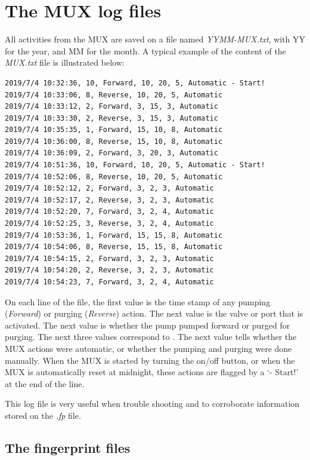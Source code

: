 \documentclass[]{book}
\begin{document}
\hypertarget{the-mux-log-files}{%
\section{The MUX log files}\label{the-mux-log-files}}

All activities from the MUX are saved on a file named \emph{YYMM-MUX.txt}, with YY for the year, and MM for the month. A typical example of the content of the \emph{MUX.txt} file is illustrated below:

\begin{verbatim}
2019/7/4 10:32:36, 10, Forward, 10, 20, 5, Automatic - Start!
2019/7/4 10:33:06, 8, Reverse, 10, 20, 5, Automatic
2019/7/4 10:33:12, 2, Forward, 3, 15, 3, Automatic
2019/7/4 10:33:30, 2, Reverse, 3, 15, 3, Automatic
2019/7/4 10:35:35, 1, Forward, 15, 10, 8, Automatic
2019/7/4 10:36:00, 8, Reverse, 15, 10, 8, Automatic
2019/7/4 10:36:09, 2, Forward, 3, 20, 3, Automatic
2019/7/4 10:51:36, 10, Forward, 10, 20, 5, Automatic - Start!
2019/7/4 10:52:06, 8, Reverse, 10, 20, 5, Automatic
2019/7/4 10:52:12, 2, Forward, 3, 2, 3, Automatic
2019/7/4 10:52:17, 2, Reverse, 3, 2, 3, Automatic
2019/7/4 10:52:20, 7, Forward, 3, 2, 4, Automatic
2019/7/4 10:52:25, 3, Reverse, 3, 2, 4, Automatic
2019/7/4 10:53:36, 1, Forward, 15, 15, 8, Automatic
2019/7/4 10:54:06, 8, Reverse, 15, 15, 8, Automatic
2019/7/4 10:54:15, 2, Forward, 3, 2, 3, Automatic
2019/7/4 10:54:20, 2, Reverse, 3, 2, 3, Automatic
2019/7/4 10:54:23, 7, Forward, 3, 2, 4, Automatic
\end{verbatim}

On each line of the file, the first value is the time stamp of any pumping (\emph{Forward}) or purging (\emph{Reverse}) action. The next value is the valve or port that is activated. The next value is whether the pump pumped forward or purged for purging. The next three values correspond to . The next value tells whether the MUX actions were automatic, or whether the pumping and purging were done manually. When the MUX is started by turning the on/off button, or when the MUX is automatically reset at midnight, these actions are flagged by a `- Start!' at the end of the line.

This log file is very useful when trouble shooting and to corroborate information stored on the \emph{.fp} file.

\hypertarget{the-fingerprint-files}{%
\subsection{The fingerprint files}\label{the-fingerprint-files}}
\end{document}
